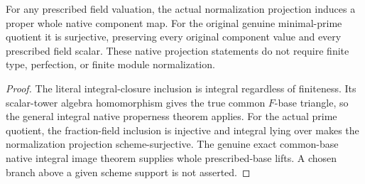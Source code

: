 \begin{theorem}
\label{scheme:normalization-component-native-lifts}
\leanok
{}
For any prescribed field valuation, the actual normalization projection
induces a proper whole native component map. For the original genuine
minimal-prime quotient it is surjective, preserving every original
component value and every prescribed field scalar. These native
projection statements do not require finite type, perfection, or finite
module normalization.
\end{theorem}
\begin{proof}
The literal integral-closure inclusion is integral regardless of
finiteness. Its scalar-tower algebra homomorphism gives the true common
$F$-base triangle, so the general integral native properness theorem
applies. For the actual prime quotient, the fraction-field inclusion is
injective and integral lying over makes the normalization projection
scheme-surjective. The genuine exact common-base native integral image
theorem supplies whole prescribed-base lifts. A chosen branch above a
given scheme support is not asserted.
\end{proof}

